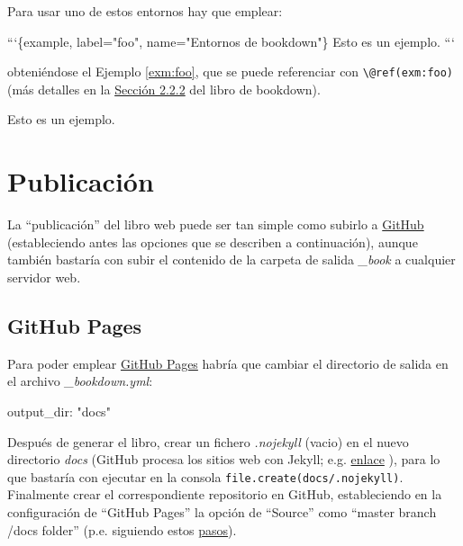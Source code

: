 \documentclass[]{book}
\newenvironment{Shaded}{\begin{snugshade}}{\end{snugshade}}
\newcommand{\StringTok}[1]{\textcolor[rgb]{0.31,0.60,0.02}{#1}}
\newcommand{\FunctionTok}[1]{\textcolor[rgb]{0.00,0.00,0.00}{#1}}
\newcommand{\AttributeTok}[1]{\textcolor[rgb]{0.77,0.63,0.00}{#1}}
\newcommand{\NormalTok}[1]{#1}
\theoremstyle{definition}
\theoremstyle{definition}
\theoremstyle{definition}
\theoremstyle{remark}
\let\BeginKnitrBlock\begin \let\EndKnitrBlock\end
\begin{document}
Para usar uno de estos entornos hay que emplear:

\begin{Shaded}
\begin{Highlighting}[]
\NormalTok{```\{example, label="foo", name="Entornos de bookdown"\}}
\NormalTok{Esto es un ejemplo.}
\NormalTok{```}
\end{Highlighting}
\end{Shaded}

obteniéndose el Ejemplo \ref{exm:foo}, que se puede referenciar con
\texttt{\textbackslash{}@ref(exm:foo)} (más detalles en la
\href{https://bookdown.org/yihui/bookdown/markdown-extensions-by-bookdown.html\#theorems}{Sección
2.2.2} del libro de bookdown).

\BeginKnitrBlock{example}[Entornos de bookdown]
\protect\hypertarget{exm:foo}{}{\label{exm:foo} {} }Esto es un ejemplo.
\EndKnitrBlock{example}

\chapter{Publicación}\label{publicacion}

La ``publicación'' del libro web puede ser tan simple como subirlo a
\href{https://help.github.com}{GitHub} (estableciendo antes las opciones
que se describen a continuación), aunque también bastaría con subir el
contenido de la carpeta de salida \emph{\_book} a cualquier servidor
web.

\section{GitHub Pages}\label{github}

Para poder emplear \href{https://pages.github.com}{GitHub Pages} habría
que cambiar el directorio de salida en el archivo \emph{\_bookdown.yml}:

\begin{Shaded}
\begin{Highlighting}[]
\FunctionTok{output_dir:}\AttributeTok{ }\StringTok{"docs"}
\end{Highlighting}
\end{Shaded}

Después de generar el libro, crear un fichero \emph{.nojekyll} (vacio)
en el nuevo directorio \emph{docs} (GitHub procesa los sitios web con
Jekyll; e.g.
\href{https://help.github.com/articles/using-jekyll-as-a-static-site-generator-with-github-pages}{enlace}
), para lo que bastaría con ejecutar en la consola
\texttt{file.create(\textquotesingle{}docs/.nojekyll\textquotesingle{})}.
Finalmente crear el correspondiente repositorio en GitHub, estableciendo
en la configuración de ``GitHub Pages'' la opción de ``Source'' como
``master branch /docs folder'' (p.e. siguiendo estos
\href{https://help.github.com/articles/configuring-a-publishing-source-for-github-pages}{pasos}).
\end{document}
